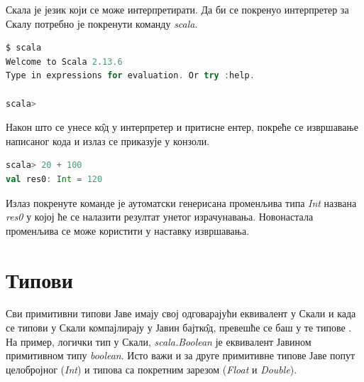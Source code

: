 \documentclass[12pt,oneside]{memoir}
\begin{document}
Скала је језик који се може интерпретирати. Да би се покренуо интерпретер за Скалу потребно је покренути команду \textit{scala}.

\begin{lstlisting}[language=Scala, caption={Интерпретер за Скалу}, label={lst:scala_scala_interpreter_example}, basicstyle=\small]
$ scala
Welcome to Scala 2.13.6
Type in expressions for evaluation. Or try :help.

scala>
\end{lstlisting}

Након што се унесе к\^{о}д у интерпретер и притисне ентер, покреће се извршавање написаног кода и излаз се приказује у конзоли.

\begin{lstlisting}[language=Scala, caption={Пример извршавања кода у интерпретеру}, label={lst:scala_interpreter_code_example}, basicstyle=\small]
scala> 20 + 100
val res0: Int = 120
\end{lstlisting}

Излаз покренуте команде је аутоматски генерисана променљива типа \textit{Int} названа \textit{res0} у којој ће се налазити резултат унетог израчунавања. Новонастала променљива се може користити у наставку извршавања.



%

\section{Типови}
\label{sec:scala_tip}

Сви примитивни типови Јаве имају свој одговарајући еквивалент у Скали и када се типови у Скали компајлирају у Јавин бајтк\^{о}д, превешће се баш у те типове \cite{scala_prog}. На пример, логички тип у Скали, \textit{scala.Boolean} је еквивалент Јавином примитивном типу \textit{boolean}. Исто важи и за друге примитивне типове Јаве попут целобројног (\textit{Int}) и типова са покретним зарезом (\textit{Float} и \textit{Double}).
\end{document}
